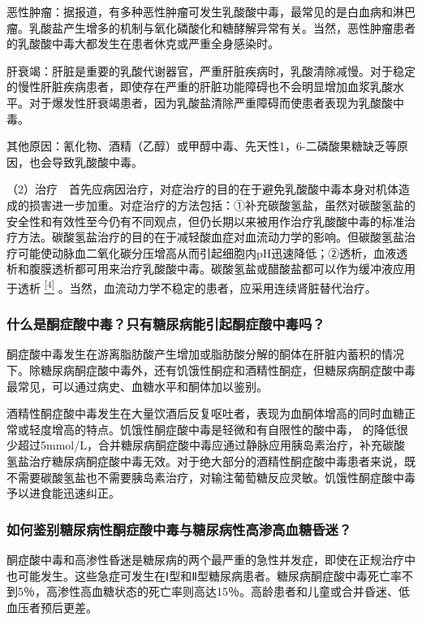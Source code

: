 恶性肿瘤：据报道，有多种恶性肿瘤可发生乳酸酸中毒，最常见的是白血病和淋巴瘤。乳酸盐产生增多的机制与氧化磷酸化和糖酵解异常有关。当然，恶性肿瘤患者的乳酸酸中毒大都发生在患者休克或严重全身感染时。

肝衰竭：肝脏是重要的乳酸代谢器官，严重肝脏疾病时，乳酸清除减慢。对于稳定的慢性肝脏疾病患者，即使存在严重的肝脏功能障碍也不会明显增加血浆乳酸水平。对于爆发性肝衰竭患者，因为乳酸盐清除严重障碍而使患者表现为乳酸酸中毒。

其他原因：氰化物、酒精（乙醇）或甲醇中毒、先天性1，6-二磷酸果糖缺乏等原因，也会导致乳酸酸中毒。

（2）治疗　首先应病因治疗，对症治疗的目的在于避免乳酸酸中毒本身对机体造成的损害进一步加重。对症治疗的方法包括：①补充碳酸氢盐，虽然对碳酸氢盐的安全性和有效性至今仍有不同观点，但仍长期以来被用作治疗乳酸酸中毒的标准治疗方法。碳酸氢盐治疗的目的在于减轻酸血症对血流动力学的影响。但碳酸氢盐治疗可能使动脉血二氧化碳分压增高从而引起细胞内pH迅速降低；②透析，血液透析和腹膜透析都可用来治疗乳酸酸中毒。碳酸氢盐或醋酸盐都可以作为缓冲液应用于透析
\protect\hyperlink{text00026.htmlux5cux23ch4-25}{\textsuperscript{{[}4{]}}}
。当然，血流动力学不稳定的患者，应采用连续肾脏替代治疗。

\subsubsection{什么是酮症酸中毒？只有糖尿病能引起酮症酸中毒吗？}

酮症酸中毒发生在游离脂肪酸产生增加或脂肪酸分解的酮体在肝脏内蓄积的情况下。除糖尿病酮症酸中毒外，还有饥饿性酮症和酒精性酮症，但糖尿病酮症酸中毒最常见，可以通过病史、血糖水平和酮体加以鉴别。

酒精性酮症酸中毒发生在大量饮酒后反复呕吐者，表现为血酮体增高的同时血糖正常或轻度增高的特点。饥饿性酮症酸中毒是轻微和有自限性的酸中毒，
的降低很少超过5mmol/L，合并糖尿病酮症酸中毒应通过静脉应用胰岛素治疗，补充碳酸氢盐治疗糖尿病酮症酸中毒无效。对于绝大部分的酒精性酮症酸中毒患者来说，既不需要碳酸氢盐也不需要胰岛素治疗，对输注葡萄糖反应灵敏。饥饿性酮症酸中毒予以进食能迅速纠正。

\subsubsection{如何鉴别糖尿病性酮症酸中毒与糖尿病性高渗高血糖昏迷？}

酮症酸中毒和高渗性昏迷是糖尿病的两个最严重的急性并发症，即使在正规治疗中也可能发生。这些急症可发生在Ⅰ型和Ⅱ型糖尿病患者。糖尿病酮症酸中毒死亡率不到5％，高渗性高血糖状态的死亡率则高达15％。高龄患者和儿童或合并昏迷、低血压者预后更差。

